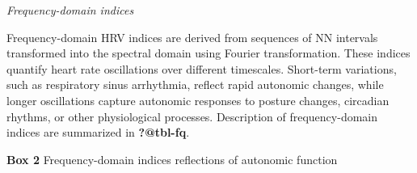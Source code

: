 \documentclass[
  a4paper,
  headsepline=true,
  open=any]{scrbook}
\begin{document}
\emph{Frequency-domain indices}

Frequency-domain HRV indices are derived from sequences of NN intervals
transformed into the spectral domain using Fourier transformation. These
indices quantify heart rate oscillations over different timescales.
Short-term variations, such as respiratory sinus arrhythmia, reflect
rapid autonomic changes, while longer oscillations capture autonomic
responses to posture changes, circadian rhythms, or other physiological
processes. Description of frequency-domain indices are summarized in
\textbf{?@tbl-fq}.

\begin{table}

\caption{\textbf{Box 2} Frequency-domain indices reflections of
autonomic function}\begin{minipage}[t]{\linewidth}

{\centering 

}
\end{minipage}
\end{table}
\end{document}
